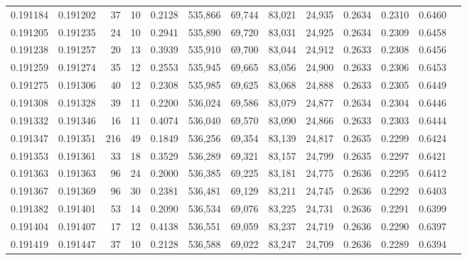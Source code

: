 \begin{tabular}{rrrrrrrrrrrrr}
0.191184 & 0.191202 &    37 &  10 &                                     0.2128 & 535,866 &  69,744 &  83,021 &  24,935 & 0.2634 & 0.2310 & 0.6460 \\
0.191205 & 0.191235 &    24 &  10 &                                     0.2941 & 535,890 &  69,720 &  83,031 &  24,925 & 0.2634 & 0.2309 & 0.6458 \\
0.191238 & 0.191257 &    20 &  13 &                                     0.3939 & 535,910 &  69,700 &  83,044 &  24,912 & 0.2633 & 0.2308 & 0.6456 \\
0.191259 & 0.191274 &    35 &  12 &                                     0.2553 & 535,945 &  69,665 &  83,056 &  24,900 & 0.2633 & 0.2306 & 0.6453 \\
0.191275 & 0.191306 &    40 &  12 &                                     0.2308 & 535,985 &  69,625 &  83,068 &  24,888 & 0.2633 & 0.2305 & 0.6449 \\
0.191308 & 0.191328 &    39 &  11 &                                     0.2200 & 536,024 &  69,586 &  83,079 &  24,877 & 0.2634 & 0.2304 & 0.6446 \\
0.191332 & 0.191346 &    16 &  11 &                                     0.4074 & 536,040 &  69,570 &  83,090 &  24,866 & 0.2633 & 0.2303 & 0.6444 \\
0.191347 & 0.191351 &   216 &  49 &                                     0.1849 & 536,256 &  69,354 &  83,139 &  24,817 & 0.2635 & 0.2299 & 0.6424 \\
0.191353 & 0.191361 &    33 &  18 &                                     0.3529 & 536,289 &  69,321 &  83,157 &  24,799 & 0.2635 & 0.2297 & 0.6421 \\
0.191363 & 0.191363 &    96 &  24 &                                     0.2000 & 536,385 &  69,225 &  83,181 &  24,775 & 0.2636 & 0.2295 & 0.6412 \\
0.191367 & 0.191369 &    96 &  30 &                                     0.2381 & 536,481 &  69,129 &  83,211 &  24,745 & 0.2636 & 0.2292 & 0.6403 \\
0.191382 & 0.191401 &    53 &  14 &                                     0.2090 & 536,534 &  69,076 &  83,225 &  24,731 & 0.2636 & 0.2291 & 0.6399 \\
0.191404 & 0.191407 &    17 &  12 &                                     0.4138 & 536,551 &  69,059 &  83,237 &  24,719 & 0.2636 & 0.2290 & 0.6397 \\
0.191419 & 0.191447 &    37 &  10 &                                     0.2128 & 536,588 &  69,022 &  83,247 &  24,709 & 0.2636 & 0.2289 & 0.6394 \\

\end{tabular}

